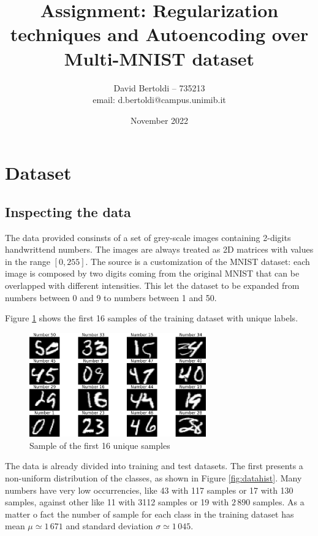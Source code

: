 \documentclass[compsoc]{IEEEtran}
\title{Assignment: Regularization techniques and Autoencoding over Multi-MNIST dataset}
\author{David Bertoldi -- 735213 \\ email: d.bertoldi@campus.unimib.it}
\affil{Department of Informatics, Systems and Communication}
\affil{University of Milano-Bicocca}
\date{November 2022}
\begin{document}
\maketitle 
\section{Dataset}
\subsection{Inspecting the data}
The data provided consinsts of a set of grey-scale images containing 2-digits handwrittend numbers. The images are always treated as
2D matrices with values in the range $[0, 255]$.
The source is a customization of the MNIST dataset: each image is composed by two digits coming from
the original MNIST that can be overlapped with different intensities. This let the dataset to be expanded from
numbers between 0 and 9 to numbers between 1 and 50. \par

Figure \ref{fig:sample} shows the first 16 samples of the training dataset with unique labels.

\begin{figure}[ht!]
\centering                                                                        
\includegraphics[width=3in]{sample.png}
\captionsetup{justification=centering}                                                                                                                                   
\caption{Sample of the first 16 unique samples}
\label{fig:sample}
\end{figure}

The data is already divided into training and test datasets. The first presents a non-uniform distribution of the classes,
as shown in Figure \ref{fig:datahist}. 
Many numbers have very low occurrencies, like 43 with 117 samples or 17 with 130 samples, against other like 11 with 3112 samples or 19 with $2\,890$ samples.
As a matter o fact the number of sample for each class in the training dataset has mean $\mu\simeq 1\,671$ and standard deviation $\sigma\simeq 1\,045$.
\end{document}
